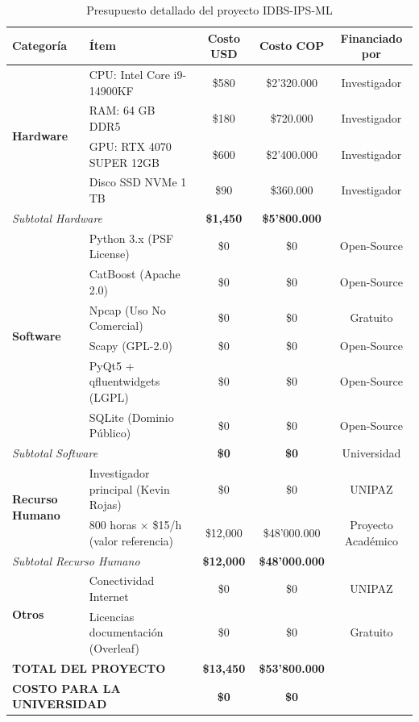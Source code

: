 \documentclass[12pt, letterpaper, oneside]{report}
\newcommand{\tabhead}[1]{\textbf{\color{white}#1}}
\begin{document}
\begin{table}[H]
  \centering
  \caption{Presupuesto detallado del proyecto IDBS-IPS-ML}
  \label{tab:presupuesto}
  \begin{tabularx}{\textwidth}{p{3.5cm} X c c c}
    \toprule
    \rowcolor{unipazblue}
    \tabhead{Categoría} & \tabhead{Ítem} & \tabhead{Costo USD} & \tabhead{Costo COP} & \tabhead{Financiado por} \\
    \midrule
    \multirow{4}{*}{\textbf{Hardware}} 
      & CPU: Intel Core i9-14900KF & \$580 & \$2'320.000 & Investigador \\
      & RAM: 64 GB DDR5 & \$180 & \$720.000 & Investigador \\
      & GPU: RTX 4070 SUPER 12GB & \$600 & \$2'400.000 & Investigador \\
      & Disco SSD NVMe 1 TB & \$90 & \$360.000 & Investigador \\
    \midrule
    \multicolumn{2}{l}{\textit{Subtotal Hardware}} & \textbf{\$1,450} & \textbf{\$5'800.000} & \\
    \midrule
    \multirow{6}{*}{\textbf{Software}} 
      & Python 3.x (PSF License) & \$0 & \$0 & Open-Source \\
      & CatBoost (Apache 2.0) & \$0 & \$0 & Open-Source \\
      & Npcap (Uso No Comercial) & \$0 & \$0 & Gratuito \\
      & Scapy (GPL-2.0) & \$0 & \$0 & Open-Source \\
      & PyQt5 + qfluentwidgets (LGPL) & \$0 & \$0 & Open-Source \\
      & SQLite (Dominio Público) & \$0 & \$0 & Open-Source \\
    \midrule
    \multicolumn{2}{l}{\textit{Subtotal Software}} & \textbf{\$0} & \textbf{\$0} & Universidad \\
    \midrule
    \multirow{2}{*}{\textbf{Recurso Humano}} 
      & Investigador principal (Kevin Rojas) & \$0 & \$0 & UNIPAZ \\
      & 800 horas $\times$ \$15/h (valor referencia) & \$12,000 & \$48'000.000 & Proyecto Académico \\
    \midrule
    \multicolumn{2}{l}{\textit{Subtotal Recurso Humano}} & \textbf{\$12,000} & \textbf{\$48'000.000} & \\
    \midrule
    \multirow{2}{*}{\textbf{Otros}} 
      & Conectividad Internet & \$0 & \$0 & UNIPAZ \\
      & Licencias documentación (Overleaf) & \$0 & \$0 & Gratuito \\
    \midrule
    \multicolumn{2}{l}{\textbf{TOTAL DEL PROYECTO}} & \textbf{\$13,450} & \textbf{\$53'800.000} & \\
    \midrule
    \multicolumn{2}{l}{\textbf{COSTO PARA LA UNIVERSIDAD}} & \textbf{\$0} & \textbf{\$0} & \\
    \bottomrule
  \end{tabularx}
\end{table}
\end{document}
